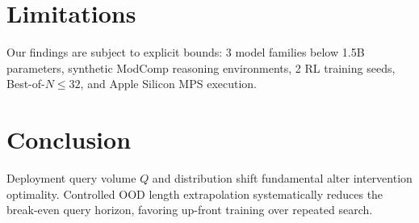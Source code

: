 \documentclass[11pt]{article}
\begin{document}
\section{Limitations}
Our findings are subject to explicit bounds: 3 model families below 1.5B parameters, synthetic ModComp reasoning environments, 2 RL training seeds, Best-of-$N \le 32$, and Apple Silicon MPS execution.

\section{Conclusion}
Deployment query volume $Q$ and distribution shift fundamental alter intervention optimality. Controlled OOD length extrapolation systematically reduces the break-even query horizon, favoring up-front training over repeated search.



\end{document}
